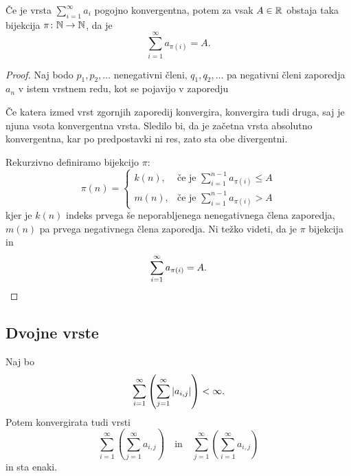 \documentclass[12pt, a4paper]{article}
\begin{document}
\begin{izrek}
Če je vrsta $\displaystyle\sum_{i=1}^\infty a_i$ pogojno konvergentna, potem za vsak $A\in\mathbb{R}$ obstaja taka bijekcija $\pi\colon\mathbb{N}\to\mathbb{N}$, da je
\[
\sum_{i=1}^\infty a_{\pi(i)}=A.
\]
\end{izrek}

\begin{proof}
Naj bodo $p_1,p_2,\dots$ nenegativni členi, $q_1,q_2,\dots$ pa negativni členi zaporedja $a_n$ v istem vrstnem redu, kot se pojavijo v zaporedju

Če katera izmed vrst zgornjih zaporedij konvergira, konvergira tudi druga, saj je njuna vsota konvergentna vrsta. Sledilo bi, da je začetna vrsta absolutno konvergentna, kar po predpostavki ni res, zato sta obe divergentni.

Rekurzivno definiramo bijekcijo $\pi$:
\[
\pi(n)=\begin{cases}
k(n), &\text{če je $\displaystyle\sum_{i=1}^{n-1} a_{\pi(i)}\leq A$}
\\
m(n), &\text{če je $\displaystyle\sum_{i=1}^{n-1} a_{\pi(i)}>A$}
\end{cases}
\]
kjer je $k(n)$ indeks prvega še neporabljenega nenegativnega člena zaporedja, $m(n)$ pa prvega negativnega člena zaporedja. Ni težko videti, da je $\pi$ bijekcija in
\[
\sum_{i=1}^\infty a_{\pi(i)}=A.\qedhere
\]
\end{proof}

\newpage

\subsection{Dvojne vrste}

\begin{izrek}[Fubini]
Naj bo
\[
\sum_{i=1}^\infty\left(\sum_{j=1}^\infty\left\lvert a_{i,j}\right\rvert\right)<\infty.
\]
Potem konvergirata tudi vrsti
\[
\sum_{i=1}^\infty\left(\sum_{j=1}^\infty a_{i,j}\right)\quad\text{in}\quad \sum_{j=1}^\infty\left(\sum_{i=1}^\infty a_{i,j}\right)
\]
in sta enaki.
\end{izrek}
\end{document}
